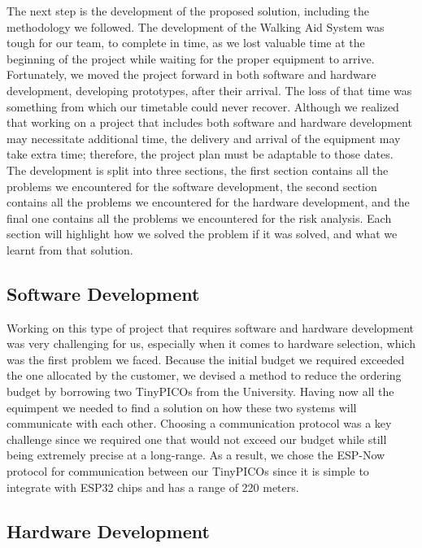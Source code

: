     The next step is the development of the proposed solution, including the methodology we followed. The development of the Walking Aid System was tough for our team, to complete in time, as we lost valuable time at the beginning of the project while waiting for the proper equipment to arrive. Fortunately, we moved the project forward in both software and hardware development, developing prototypes, after their arrival. The loss of that time was something from which our timetable could never recover. Although we realized that working on a project that includes both software and hardware development may necessitate additional time, the delivery and arrival of the equipment may take extra time; therefore, the project plan must be adaptable to those dates. The development is split into three sections, the first section contains all the problems we encountered for the software development, the second section contains all the problems we encountered for the hardware development, and the final one contains all the problems we encountered for the risk analysis. Each section will highlight how we solved the problem if it was solved, and what we learnt from that solution.

    \subsection{Software Development}
    \label{ssec:software}

    Working on this type of project that requires software and hardware development was very challenging for us, especially when it comes to hardware selection, which was the first problem we faced. Because the initial budget we required exceeded the one allocated by the customer, we devised a method to reduce the ordering budget by borrowing two TinyPICOs from the University. Having now all the equimpent we needed to find a solution on how these two systems will communicate with each other. Choosing a communication protocol was a key challenge since we required one that would not exceed our budget while still being extremely precise at a long-range. As a result, we chose the ESP-Now protocol for communication between our TinyPICOs since it is simple to integrate with ESP32 chips and has a range of 220 meters.


    \subsection{Hardware Development}
    \label{ssec:hardware}

